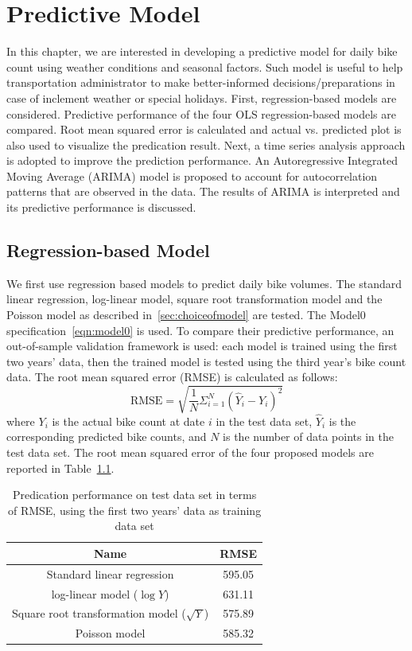 \documentclass [11pt, proquest] {uwthesis}[2015/03/03]
\begin{document}


\chapter{Predictive Model}
\label{chp:predictive}

In this chapter, we are interested in developing a predictive model for daily bike count using weather conditions and seasonal factors. Such model is useful to help transportation administrator to make better-informed decisions/preparations in case of inclement weather or special holidays. 
First, regression-based models are considered. Predictive performance of the four OLS regression-based models are compared. Root mean squared error is calculated and actual vs. predicted plot is also used to visualize the predication result. Next, a time series analysis approach is adopted to improve the prediction performance. An Autoregressive Integrated Moving Average (ARIMA) model is proposed to account for autocorrelation patterns that are observed in the data. The results of ARIMA is interpreted and its predictive performance is discussed.

\section{Regression-based Model}
We first use regression based models to predict daily bike volumes. The standard linear regression, log-linear model, square root transformation model and the Poisson model as described in~\ref{sec:choiceofmodel} are tested. The Model0 specification~\eqref{eqn:model0} is used. To compare their predictive performance, an out-of-sample validation framework is used: each model is trained using the first two years' data, then the trained model is tested using the third year's bike count data. The root mean squared error (RMSE) is calculated as follows:
\begin{equation*}
\text{RMSE} = \sqrt{\frac{1}{N}\Sigma_{i=1}^N (\hat{Y}_i - Y_i)^2}
\end{equation*}
where $Y_i$ is the actual bike count at date $i$ in the test data set, $\hat{Y}_i$ is the corresponding predicted bike counts, and $N$ is the number of data points in the test data set. The root mean squared error of the four proposed models are reported in Table~\ref{tbl:pred4model}.

\begin{table}
 \centering 
\small
\begin{tabular}{ c | c } 
\hline 
  Name & RMSE \\ 
\hline
  Standard linear regression & 595.05  \\ 
  log-linear model ($\log{Y}$) & 631.11 \\ 
  Square root transformation model ($\sqrt{Y}$) & 575.89\\ 
  Poisson model & 585.32 \\
\hline 
\end{tabular} 
\caption{Predication performance on test data set in terms of RMSE, using the first two years' data as training data set}   
\label{tbl:pred4model} 
\end{table} 
\end{document}
